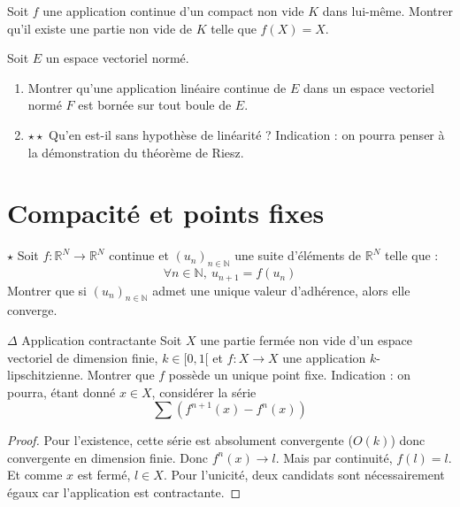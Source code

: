 \documentclass[french,a4paper]{article}
\newcommand{\N}{\mathbb{N}}
\newcommand{\R}{\mathbb{R}}
\theoremstyle{plain}
\theoremstyle{definition}
\theoremstyle{remark}
\begin{document}
\begin{ex}[Moulin.22]{}
	Soit $f$ une application continue d'un compact non vide $K$ dans lui-même. Montrer qu'il existe une partie non vide de $K$ telle que $f(X)=X$.
\end{ex}

\begin{ex}[Moulin.23]{}
	Soit $E$ un espace vectoriel normé.
	\begin{enumerate}
		\item Montrer qu'une application linéaire continue de $E$ dans un espace vectoriel normé $F$ est bornée sur tout boule de $E$.
		\item $\star\star$ Qu'en est-il sans hypothèse de linéarité ? Indication : on pourra penser à la démonstration du théorème de Riesz.
	\end{enumerate}
\end{ex}

\section{Compacité et points fixes}

\begin{ex}[Moulin.24]{$\star$}
	Soit $f:\R^N\to\R^N$ continue et $(u_n)_{n\in\N}$ une suite d'éléments de $\R^N$ telle que : $$\forall n\in\N,\ u_{n+1}=f(u_n)$$ Montrer que si $(u_n)_{n\in\N}$ admet une unique valeur d'adhérence, alors elle converge.
\end{ex}

\begin{ex}[Moulin.25]{$\Delta$ Application contractante}
	Soit $X$ une partie fermée non vide d'un espace vectoriel de dimension finie, $k\in[0,1[$ et $f:X\to X$ une application $k$-lipschitzienne. Montrer que $f$ possède un unique point fixe. Indication : on pourra, étant donné $x\in X$, considérer la série $$\sum (f^{n+1}(x)-f^n(x))$$
\end{ex}
\begin{proof}
	Pour l'existence, cette série est absolument convergente ($O(k)$) donc convergente en dimension finie. Donc $f^{n}(x)\to l$. Mais par continuité, $f(l)=l$. Et comme $x$ est fermé, $l\in X$. Pour l'unicité, deux candidats sont nécessairement égaux car l'application est contractante.
\end{proof}
\end{document}
